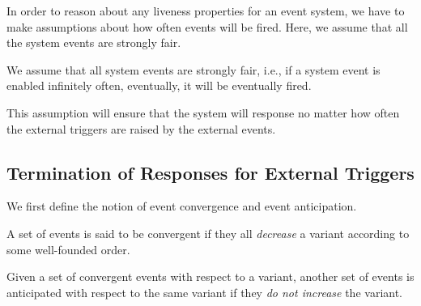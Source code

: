In order to reason about any liveness properties for an event system,
we have to make assumptions about how often events will be fired.
Here, we assume that all the system events are strongly fair.
\begin{assumption}
  \label{asm:SF}
  We assume that all system events are strongly fair, i.e., if a system
  event is enabled infinitely often, eventually, it will be eventually
  fired.
\end{assumption}
This assumption will ensure that the system will response no matter
how often the external triggers are raised by the external events.

\subsection{Termination of Responses for External Triggers}
\label{sec:contr-rema-resp}

We first define the notion of event convergence and event
anticipation.
\begin{definition}
  \label{def:conv}
  A set of events is said to be convergent if they all \emph{decrease}
  a variant according to some well-founded order.
\end{definition}

\begin{definition}
  \label{def:anticipated}
  Given a set of convergent events with respect to a variant,
  another set of events is anticipated with respect to the
  same variant if they \emph{do not increase} the variant.
\end{definition}

